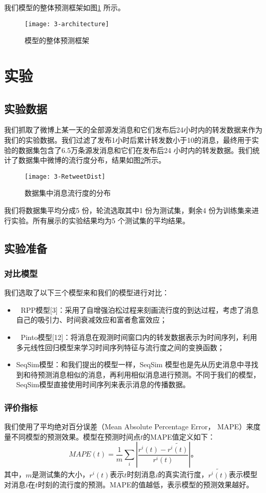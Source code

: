 我们模型的整体预测框架如图\ref{fig:architecture} 所示。
\begin{figure}[!htbp]
  \centering
  \texttt{[image: 3-architecture]}
  \caption{模型的整体预测框架}
  \label{fig:architecture}
\end{figure}

\section{实验}
\subsection{实验数据}
我们抓取了微博上某一天的全部源发消息和它们发布后24小时内的转发数据来作为我们的实验数据。我们过滤了发布1小时后累计转发数小于10的消息，最终用于实验的数据集包含了6.5万条源发消息和它们在发布后24 小时内的转发数据。我们统计了数据集中微博的流行度分布，结果如图\ref{fig:retweetDist}所示。
\begin{figure}[!htbp]
  \centering
  \texttt{[image: 3-RetweetDist]}
  \caption{数据集中消息流行度的分布}
  \label{fig:retweetDist}
\end{figure}

我们将数据集平均分成5 份，轮流选取其中1 份为测试集，剩余4 份为训练集来进行实验。所有展示的实验结果均为5 个测试集的平均结果。
\subsection{实验准备}
\subsubsection{对比模型}
我们选取了以下三个模型来和我们的模型进行对比：
\begin{itemize}
\item 	RPP模型[3]：采用了自增强泊松过程来刻画流行度的到达过程，考虑了消息自己的吸引力、时间衰减效应和富者愈富效应；
\item 	Pinto模型[12]：将消息在观测时间窗口内的转发数据表示为时间序列，利用多元线性回归模型来学习时间序列特征与流行度之间的变换函数；
\item SeqSim模型：和我们提出的模型一样，SeqSim 模型也是先从历史消息中寻找到和待预测消息相似的消息，再利用相似消息进行预测。不同于我们的模型，SeqSim模型直接使用时间序列来表示消息的传播数据。
\end{itemize}
\subsubsection{评价指标}
我们使用了平均绝对百分误差（Mean Absolute Percentage Error， MAPE）来度量不同模型的预测效果。模型在预测时间点$t$的MAPE值定义如下：
 \begin{displaymath}
 MAPE(t)=\frac{1}{m}\sum_{i} |\frac{r^i (t)-\widetilde{r^i (t)}}{r^i (t)}|\text{。}
 \end{displaymath}
其中，$m$是测试集的大小，$r^i (t)$表示$t$时刻消息$i$的真实流行度，$\widetilde{r^i (t)}$表示模型对消息$i$在$t$时刻的流行度的预测。MAPE的值越低，表示模型的预测效果越好。
